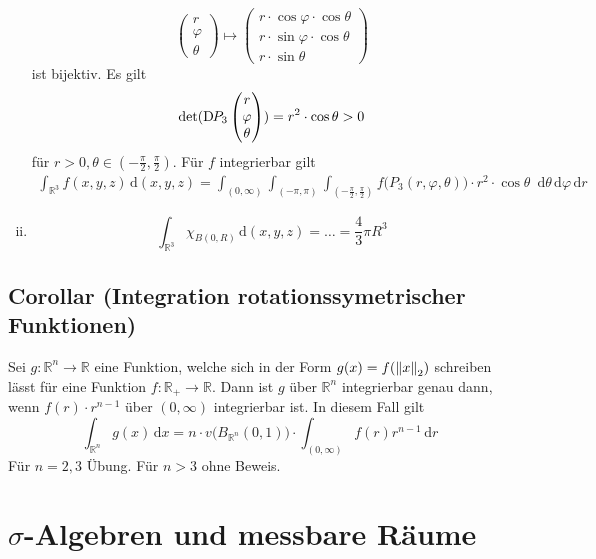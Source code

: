 \begin{enumerate}[(i)]
	\[
		\begin{pmatrix}
			r \\
			\varphi \\
			\theta
		\end{pmatrix} \mapsto
		\begin{pmatrix}
			r \cdot \cos \varphi \cdot \cos \theta \\
			r \cdot \sin \varphi \cdot \cos \theta \\
			r \cdot \sin \theta
		\end{pmatrix}
	\]
	ist bijektiv. Es gilt
	\[
		\det (\mathrm{D}\mkern-1.5mu P_3 \begin{pmatrix}
			r \\
			\varphi \\
			\theta
		\end{pmatrix}) = r^2 \cdot \cos \theta > 0
	\]
	für $r>0, \theta \in (- \frac{\pi}{2}, \frac{\pi}{2})$. Für $f$ integrierbar gilt
	\begin{align*}
		\int_{\mathds{R}^3} f(x,y,z)  \, \mathrm{d}(x,y,z) = \int_{(0,\infty)} \int_{(-\pi , \pi )} \int_{(- \frac{\pi}{2}, \frac{\pi}{2})}
		f\big( P_3(r, \varphi, \theta) \big) \cdot r^2  \cdot \cos \theta  \enspace \mathrm{d}\theta  \, \mathrm{d}\varphi  \, \mathrm{d}r
	\end{align*}
	\item 
	\[
		\int_{\mathds{R}^3} \chi_{B(0,R)}  \, \mathrm{d}(x,y,z) = \ldots = \frac{4}{3} \pi  R^3
	\]
\end{enumerate}

\subsection{Corollar (Integration rotationssymetrischer Funktionen)} %
\label{sub:86}
Sei $g : \mathds{R}^n \to \mathds{R}$ eine Funktion, welche sich in der Form $g(x) = f(\norm[2]{x})$ schreiben lässt für eine Funktion $f : \mathds{R}_+ \to \mathds{R}$.
Dann ist $g$ über $\mathds{R}^n$ integrierbar genau dann, wenn $f(r) \cdot r^{n-1}$ über $(0, \infty)$ integrierbar ist. In diesem Fall gilt 
\[
	\int_{\mathds{R}^n} \! g(x)  \, \mathrm{d}x  = n \cdot v\big(B_{\mathds{R}^n}(0,1)\big) \cdot \int_{(0,\infty)}\! f(r) r^{n-1}  \, \mathrm{d}r
\]
Für $n=2,3$ Übung. Für $n>3$ ohne Beweis. 
\newpage

\section{$\sigma$-Algebren und messbare Räume} %
\label{sec:9}

